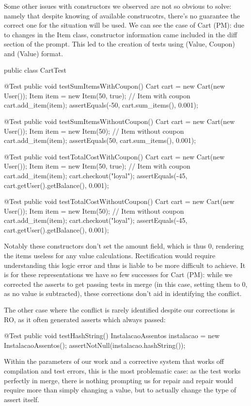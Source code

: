 Some other issues with constructors we observed are not so obvious to solve: namely that despite knowing of available construcotrs, there's no guarantee
the correct one for the situation will be used. We can see the case of Cart (PM): due to changes in the Item class, constructor information came included
in the diff section of the prompt. This led to the creation of tests using (Value, Coupon) and (Value) format.
\begin{response}
    public class CartTest {

    @Test
    public void testSumItemsWithCoupon() {
        Cart cart = new Cart(new User());
        Item item = new Item(50, true); // Item with coupon
        cart.add_item(item);
        assertEquals(-50, cart.sum_items(), 0.001);
    }

    @Test
    public void testSumItemsWithoutCoupon() {
        Cart cart = new Cart(new User());
        Item item = new Item(50); // Item without coupon
        cart.add_item(item);
        assertEquals(50, cart.sum_items(), 0.001);
    }

    @Test
    public void testTotalCostWithCoupon() {
        Cart cart = new Cart(new User());
        Item item = new Item(50, true); // Item with coupon
        cart.add_item(item);
        cart.checkout("loyal");
        assertEquals(-45, cart.getUser().getBalance(), 0.001);
    }

    @Test
    public void testTotalCostWithoutCoupon() {
        Cart cart = new Cart(new User());
        Item item = new Item(50); // Item without coupon
        cart.add_item(item);
        cart.checkout("loyal");
        assertEquals(-45, cart.getUser().getBalance(), 0.001);
    }
}
\end{response}
Notably these constructors don't set the amount field, which is thus 0, rendering the items useless for any value calculations.
Rectification would require understanding this logic error and thus is liable to be more difficult to achieve. It is for these representations
we have so few successes for Cart (PM): while we corrected the asserts to get passing tests in merge (in this case, setting them to 0, as no
value is subtracted), these corrections don't aid in identifying the conflict.

The other case where the conflict is rarely identified despite our corrections is RO, as it often generated asserts which always passed:
\begin{response}
    @Test
    public void testHashString() {
        InstalacaoAssentos instalacao = new InstalacaoAssentos();
        assertNotNull(instalacao.hashString());
    }
\end{response}
Within the parameters of our work and a corrective system that works off compilation and test errors, this is the most problematic case: as the test works perfectly in merge,
there is nothing prompting us for repair and repair would require more than simply changing a value, but to actually change the type of assert itself.

